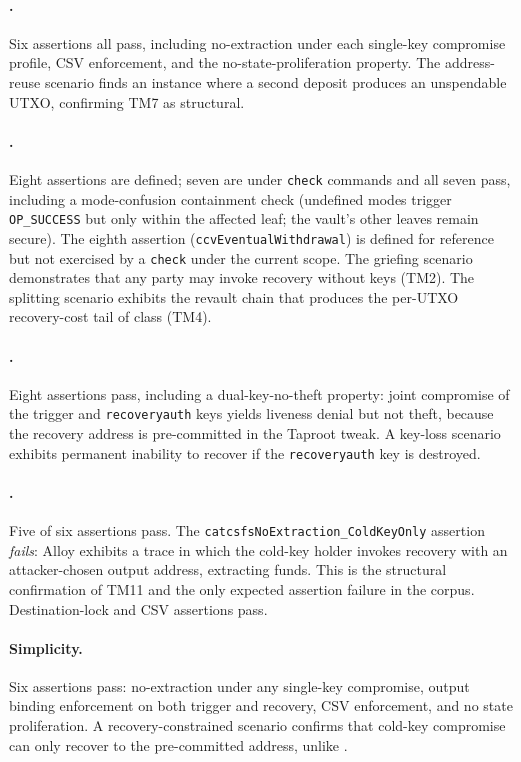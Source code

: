 \paragraph{\opctv{}.} Six assertions all pass, including
no-extraction under each single-key compromise profile, CSV
enforcement, and the no-state-proliferation property. The
address-reuse scenario finds an instance where a second deposit
produces an unspendable UTXO, confirming TM7 as structural.

\paragraph{\opccv{}.} Eight assertions are defined; seven are under
\texttt{check} commands and all seven pass, including a
mode-confusion containment check (undefined modes trigger
\texttt{OP\_SUCCESS} but only within the affected leaf; the
vault's other leaves remain secure). The eighth assertion
(\texttt{ccvEventualWithdrawal}) is defined for reference but not
exercised by a \texttt{check} under the current scope. The griefing
scenario demonstrates that any party may invoke recovery without
keys (TM2). The splitting scenario exhibits the revault chain that
produces the per-UTXO recovery-cost tail of class \classscale{}
(TM4).

\paragraph{\opvault{}.} Eight assertions pass, including a
dual-key-no-theft property: joint compromise of the trigger and
\texttt{recoveryauth} keys yields liveness denial but not theft,
because the recovery address is pre-committed in the Taproot
tweak. A key-loss scenario exhibits permanent inability to recover
if the \texttt{recoveryauth} key is destroyed.

\paragraph{\catcsfs{}.} Five of six assertions pass. The
\texttt{catcsfsNoExtraction\_ColdKeyOnly} assertion \emph{fails}:
Alloy exhibits a trace in which the cold-key holder invokes
recovery with an attacker-chosen output address, extracting funds.
This is the structural confirmation of TM11 and the only expected
assertion failure in the corpus. Destination-lock and CSV
assertions pass.

\paragraph{Simplicity.} Six assertions pass: no-extraction under
any single-key compromise, output binding enforcement on both
trigger and recovery, CSV enforcement, and no state proliferation.
A recovery-constrained scenario confirms that cold-key compromise
can only recover to the pre-committed address, unlike \catcsfs{}.

